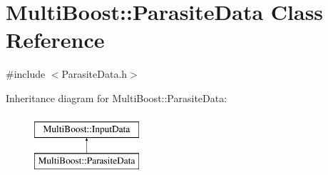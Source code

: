 \hypertarget{classMultiBoost_1_1ParasiteData}{\section{Multi\-Boost\-:\-:Parasite\-Data Class Reference}
\label{classMultiBoost_1_1ParasiteData}
}


{\ttfamily \#include $<$Parasite\-Data.\-h$>$}

Inheritance diagram for Multi\-Boost\-:\-:Parasite\-Data\-:\begin{figure}[H]
\begin{center}
\leavevmode
\includegraphics[height=2.000000cm]{classMultiBoost_1_1ParasiteData}
\end{center}
\end{figure}

